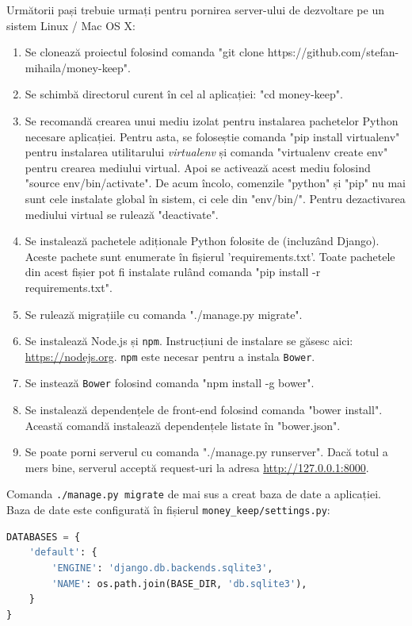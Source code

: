 Următorii pași trebuie urmați pentru pornirea server-ului
de dezvoltare pe un sistem Linux / Mac OS X:
\begin{enumerate}
\item Se clonează proiectul folosind comanda
"git clone https://github.com/stefan-mihaila/money-keep".
\item Se schimbă directorul curent în cel al aplicației: "cd money-keep".
\item Se recomandă crearea unui mediu izolat pentru 
instalarea pachetelor Python necesare aplicației.
Pentru asta, se foloseștie comanda "pip install virtualenv"
pentru instalarea utilitarului \emph{virtualenv}
și comanda "virtualenv create env" pentru crearea
mediului virtual. Apoi se activează acest mediu
folosind "source env/bin/activate". De acum încolo,
comenzile "python" și "pip" nu mai sunt cele instalate
global în sistem, ci cele din "env/bin/". Pentru dezactivarea
mediului virtual se rulează "deactivate".
\item Se instalează pachetele adiționale Python folosite de 
(incluzând Django). Aceste pachete sunt enumerate în fișierul
'requirements.txt'. Toate pachetele din acest fișier pot
fi instalate rulând comanda "pip install -r requirements.txt".
\item Se rulează migrațiile cu comanda "./manage.py migrate".
\item Se instalează Node.js și \texttt{npm}. Instrucțiuni de instalare se găsesc aici:
\url{https://nodejs.org}. \texttt{npm} este necesar pentru a instala \texttt{Bower}.
\item Se instează \texttt{Bower} folosind comanda "npm install -g bower".
\item Se instalează dependențele de front-end folosind comanda
"bower install". Această comandă instalează dependențele listate
în "bower.json".
\item Se poate porni serverul cu comanda "./manage.py runserver". Dacă
totul a mers bine, serverul acceptă request-uri la adresa \url{http://127.0.0.1:8000}.
\end{enumerate}

Comanda \texttt{./manage.py migrate} de mai sus a creat baza de date
a aplicației. Baza de date este configurată în fișierul 
\texttt{money\_keep/settings.py}:

\begin{lstlisting}[language=python, title=Configurare implicită a bazei de date]
DATABASES = {
    'default': {
        'ENGINE': 'django.db.backends.sqlite3',
        'NAME': os.path.join(BASE_DIR, 'db.sqlite3'),
    }
}
\end{lstlisting}

